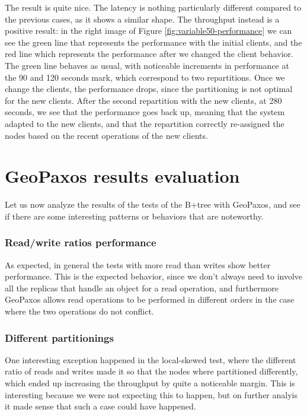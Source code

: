 The result is quite nice. The latency is nothing particularly different compared to the previous cases, as it shows a similar shape. The throughput instead is a positive result: in the right image of Figure \ref{fig:variable50-performance} we can see the green line that represents the performance with the initial clients, and the red line which represents the performance after we changed the client behavior. The green line behaves as usual, with noticeable increments in performance at the 90 and 120 seconds mark, which correspond to two repartitions. Once we change the clients, the performance drops, since the partitioning is not optimal for the new clients. After the second repartition with the new clients, at 280 seconds, we see that the performance goes back up, meaning that the system adapted to the new clients, and that the repartition correctly re-assigned the nodes based on the recent operations of the new clients.

\section{GeoPaxos results evaluation}\label{sec:geopaxos-results-evaluation}
Let us now analyze the results of the tests of the B+tree with GeoPaxos, and see if there are some interesting patterns or behaviors that are noteworthy.

\subsubsection{Read/write ratios performance}
As expected, in general the tests with more read than writes show better performance. This is the expected behavior, since we don't always need to involve all the replicas that handle an object for a read operation, and furthermore GeoPaxos allows read operations to be performed in different orders in the case where the two operations do not conflict.

\subsubsection{Different partitionings}
One interesting exception happened in the local-skewed test, where the different ratio of reads and writes made it so that the nodes where partitioned differently, which ended up increasing the throughput by quite a noticeable margin. This is interesting because we were not expecting this to happen, but on further analyis it made sense that such a case could have happened.

